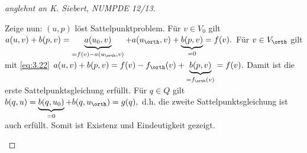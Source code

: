 \begin{st}
\begin{proof}[anglehnt an K. Siebert, NUMPDE 12/13]
\begin{seg}[\ProofImplication*]
			Zeige nun: $(u,p)$ löst Sattelpunktproblem.
			Für $v \in V_0$ gilt
			\begin{math}
				a(u,v) + b(p,v)
				= \underbrace{a(u_0,v)}_{=f(v) - a(u_\orth, v)} + a(u_\orth, v ) + \underbrace{b(p,v)}_{=0}
				= f(v).
			\end{math}
			Für $v \in V_\orth$ gilt mit \eqref{eq:3.22}
			\begin{math}
				a(u,v) + b(p,v)
				= f(v) - f_\orth(v) + \underbrace{b(p,v)}_{=f_\orth(v)}
				= f(v).
			\end{math}
			Damit ist die erste Sattelpunktsgleichung erfüllt.
			Für $q \in Q$ gilt
			\begin{math}
				b(q,u)
				= \underbrace{b(q, u_0)}_{=0} + b(q, u_\orth)
				= g(q),
			\end{math}
			d.h. die zweite Sattelpunktsgleichung ist auch erfüllt.
			Somit ist Existenz und Eindeutigkeit gezeigt.


\end{seg}
\end{proof}
\end{st}
